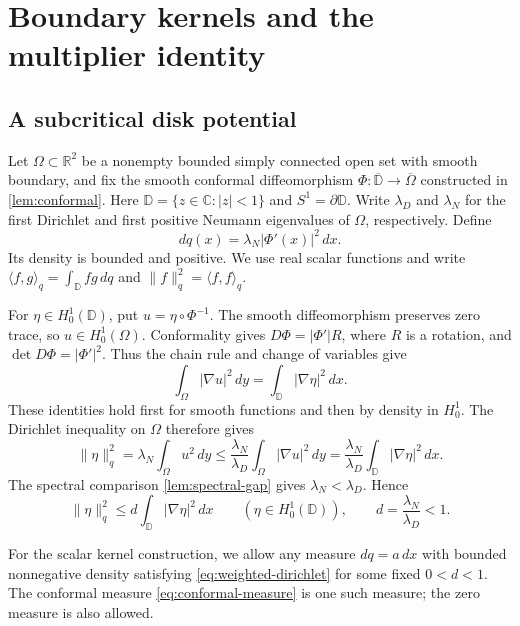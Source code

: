 \section{Boundary kernels and the multiplier identity}\label{sec:boundary-kernels}

\subsection{A subcritical disk potential}

Let $\Omega\subset\mathbb R^2$ be a nonempty bounded simply connected
open set with smooth boundary, and fix the smooth conformal
diffeomorphism $\Phi:\overline{\mathbb D}\to\overline\Omega$ constructed
in \cref{lem:conformal}. Here
$\mathbb D=\{z\in\mathbb C:|z|<1\}$ and $S^1=\partial\mathbb D$.
Write $\lambda_D$ and $\lambda_N$ for the first Dirichlet and first
positive Neumann eigenvalues of $\Omega$, respectively. Define
\begin{equation}\label{eq:conformal-measure}
 dq(x)=\lambda_N|\Phi'(x)|^2\,dx.
\end{equation}
Its density is bounded and positive. We use real scalar functions and
write $\langle f,g\rangle_q=\int_{\mathbb D}fg\,dq$ and
$\|f\|_q^2=\langle f,f\rangle_q$.

For $\eta\in H_0^1(\mathbb D)$, put $u=\eta\circ\Phi^{-1}$.
The smooth diffeomorphism preserves zero trace, so
$u\in H_0^1(\Omega)$. Conformality gives
$D\Phi=|\Phi'|R$, where $R$ is a rotation, and
$\det D\Phi=|\Phi'|^2$. Thus the chain rule and change of variables give
\[
 \int_\Omega|\nabla u|^2\,dy
 =\int_{\mathbb D}|\nabla\eta|^2\,dx.
\]
These identities hold first for smooth functions and then by density
in $H_0^1$. The Dirichlet inequality on $\Omega$ therefore gives
\[
 \|\eta\|_q^2
 =\lambda_N\int_\Omega u^2\,dy
 \le\frac{\lambda_N}{\lambda_D}\int_\Omega|\nabla u|^2\,dy
 =\frac{\lambda_N}{\lambda_D}
       \int_{\mathbb D}|\nabla\eta|^2\,dx.
\]
The spectral comparison \cref{lem:spectral-gap} gives
$\lambda_N<\lambda_D$. Hence
\begin{equation}\label{eq:weighted-dirichlet}
 \|\eta\|_q^2\le d\int_{\mathbb D}|\nabla\eta|^2\,dx
 \qquad(\eta\in H_0^1(\mathbb D)),
 \qquad d=\frac{\lambda_N}{\lambda_D}<1.
\end{equation}

For the scalar kernel construction, we allow any measure $dq=a\,dx$
with bounded nonnegative density satisfying
\cref{eq:weighted-dirichlet} for some fixed $0<d<1$.
The conformal measure \cref{eq:conformal-measure} is one such measure;
the zero measure is also allowed.

